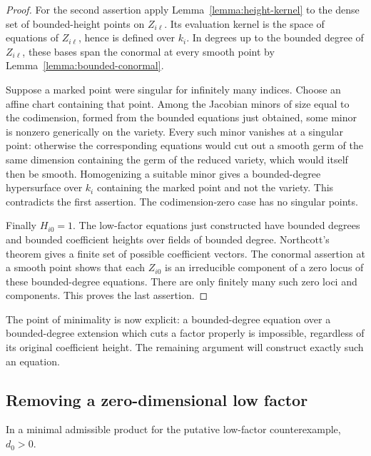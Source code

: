 \begin{proof}
For the second assertion apply Lemma~\ref{lemma:height-kernel} to
the dense set of bounded-height points on $Z_{i\ell}$.  Its
evaluation kernel is the space of equations of $Z_{i\ell}$, hence
is defined over $k_i$.  In degrees up to the bounded degree of
$Z_{i\ell}$, these bases span the conormal at every smooth point
by Lemma~\ref{lemma:bounded-conormal}.

Suppose a marked point were singular for infinitely many indices.
Choose an affine chart containing that point.  Among the Jacobian
minors of size equal to the codimension, formed from the bounded
equations just obtained, some minor is nonzero generically on the
variety.  Every such minor vanishes at a singular point: otherwise
the corresponding equations would cut out a smooth germ of the
same dimension containing the germ of the reduced variety, which
would itself then be smooth.  Homogenizing a suitable minor gives
a bounded-degree hypersurface over $k_i$ containing the marked
point and not the variety.  This contradicts the first assertion.
The codimension-zero case has no singular points.

Finally $H_{i0}=1$.  The low-factor equations just constructed have
bounded degrees and bounded coefficient heights over fields of
bounded degree.  Northcott's theorem gives a finite set of possible
coefficient vectors.  The conormal assertion at a smooth point
shows that each $Z_{i0}$ is an irreducible component of a zero locus
of these bounded-degree equations.  There are only finitely many
such zero loci and components.  This proves the last assertion.
\end{proof}

The point of minimality is now explicit: a bounded-degree equation
over a bounded-degree extension which cuts a factor properly is
impossible, regardless of its original coefficient height.  The
remaining argument will construct exactly such an equation.

\subsection{Removing a zero-dimensional low factor}

\begin{lemma}\label{lemma:fixed-low-point}
In a minimal admissible product for the putative low-factor
counterexample, $d_0>0$.
\end{lemma}

